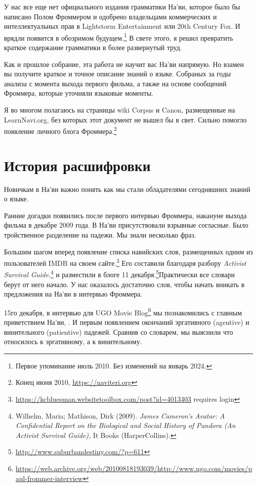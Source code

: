 
У нас все еще нет официального издания грамматики На'ви, которое было бы написано Полом Фроммером и одобрено владельцами коммерческих и интеллектуальных прав в Lightstorm Entertainment или 20th Century Fox. И врядли появится в обозримом будущем.\footnote{Первое упоминание июль 2010.  Без изменений на январь
2024.} В свете этого, я решил превратить краткое содержание грамматики в более развернутый труд.

Как и прошлое собрание, эта работа не научит вас На'ви напрямую.
Но взамен вы получите краткое и точное описание знаний о языке. Собраных за годы анализа с момента выхода первого фильма, а также на  основе сообщений Фроммера, которые уточняли языковые моменты.

Я во многом полагаюсь на страницы wiki Corpus и Canon, размещенные на LearnNavi.org,
без которых этот документ не вышел бы в свет. Сильно помогло появление личного блога Фроммера.\footnote{Конец июня 2010, \url{https://naviteri.org}}


\section{История расшифровки}
Новичкам в На'ви важно понять как мы стали обладателями сегодняшних знаний о языке.

Ранние догадки появились после первого интервью Фроммера, накануне выхода фильма в декабре 2009 года. В На'ви присутствовали взрывные согласные. Было тройственное разделение на падежи. Мы знали несколько фраз.

Большим шагом вперед появление списка навийских слов, размещенных одним из пользователей IMDB на своем сайте.\footnote{\url{https://kcbluesman.websitetoolbox.com/post?id=4013403}
requires login}  Его составили благодаря разбору \textit{Activist
Survival Guide}.\footnote{Wilhelm, Maria; Mathison, Dirk (2009). \textit{James
Cameron's Avatar: A Confidential Report on the Biological and Social
History of Pandora (An Activist Survival Guide),} It Books (HarperCollins).}
и разместили в блоге 11 декабря.\footnote{\url{http://www.suburbandestiny.com/?p=611}}Практически все словари берут от него начало.  У нас оказалось достаточно слов, чтобы начать вникать в предложения на На'ви в интервью Фроммера.

15го декабря, в интервью для UGO Movie
Blog\footnote{\url{https://web.archive.org/web/20100818193039/http://www.ugo.com/movies/paul-frommer-interview}}
мы познакомились с главным приветствием На'ви,  .  И первым появлением окончаний эргативного (agentive) и винительного (patientive) падежей.  Сравнив со словарем, мы выяснили что  относилось к эргативному, а  к винительному.

